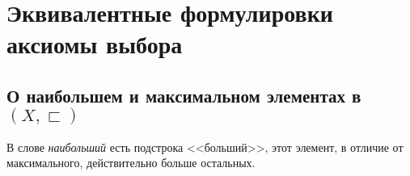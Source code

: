\documentclass[a4paper]{report}
\begin{document}
    \section{Эквивалентные формулировки аксиомы выбора}

    \subsection{О наибольшем и максимальном элементах в $(X, \sqsubset)$}

     В слове \emph{наибольший} есть подстрока <<больший>>, этот элемент, в отличие от максимального, действительно больше остальных.
\end{document}
